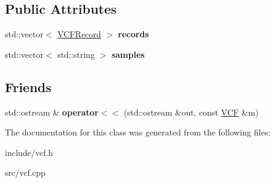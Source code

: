\subsection*{Public Attributes}
\begin{DoxyCompactItemize}
\item 
\mbox{\label{classVCF_ab8f80911b0f85d25cf5db5c9ae3a9fde}} 
std\+::vector$<$ \hyperlink{structVCFRecord}{V\+C\+F\+Record} $>$ {\bfseries records}
\item 
\mbox{\label{classVCF_a919f0d1cd538ec4a52fc4c45a7db0148}} 
std\+::vector$<$ std\+::string $>$ {\bfseries samples}
\end{DoxyCompactItemize}
\subsection*{Friends}
\begin{DoxyCompactItemize}
\item 
\mbox{\label{classVCF_a5aee2ddd11bc238dc603ec57bebf9cbb}} 
std\+::ostream \& {\bfseries operator$<$$<$} (std\+::ostream \&out, const \hyperlink{classVCF}{V\+CF} \&m)
\end{DoxyCompactItemize}


The documentation for this class was generated from the following files\+:\begin{DoxyCompactItemize}
\item 
include/vcf.\+h\item 
src/vcf.\+cpp\end{DoxyCompactItemize}
